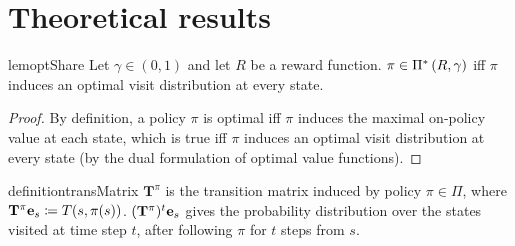 \section{Theoretical results} \label{app:proofs}
\begin{restatable}{lem}{optShare}\label{lem:opt-pol-visit-iff}
Let $\gamma \in (0,1)$ and let $R$ be a reward function. $\pi \in \optPi$ iff $\pi$ induces an optimal visit distribution at every state. 
\end{restatable}
\begin{proof}
By definition, a policy $\pi$ is optimal iff $\pi$ induces the maximal on-policy value at each state, which is true iff $\pi$ induces an optimal visit distribution at every state (by the dual formulation of optimal value functions). 
\end{proof}

\begin{restatable}{definition}{transMatrix}\label{def:trans-matrix}
$\mathbf{T}^\pi$ is the transition matrix induced by policy $\pi \in \Pi$, where $\mathbf{T}^\pi\mathbf{e}_{s} \coloneqq T(s,\pi(s))$. $(\mathbf{T}^\pi)^t \mathbf{e}_{s}$ gives the probability distribution over the states visited at time step $t$, after following $\pi$ for $t$ steps from $s$.
\end{restatable} 

